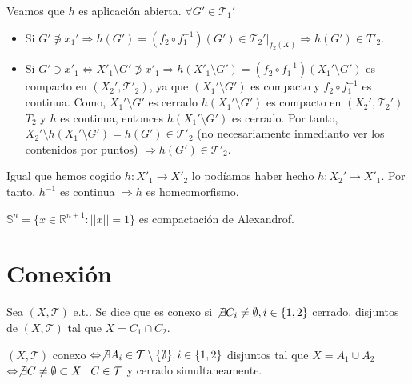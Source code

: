 \begin{dem}
\begin{enumerate}[label=(\roman*)]
      Veamos que $h$ es aplicación abierta. $\forall G' \in \mathcal{T}_{1}'$
      \begin{itemize}
        \item Si $G' \not \ni x_{1}' \Rightarrow h(G') = (f_{2} \circ f_{1}^{-1})(G') \in \mathcal{T}_{2}'|_{f_{2}(X)} \Rightarrow h(G') \in T'_{2}$.
        \item Si $G' \ni x'_{1} \Leftrightarrow X'_{1} \setminus G' \not \ni x'_{1} \Rightarrow h(X'_{1} \setminus G') = (f_{2} \circ f_{1}^{-1}) (X_{1}' \setminus G')$ es compacto en $(X_{2}', \mathcal{T}'_{2})$, ya que $(X_{1}' \setminus G')$ es compacto y $f_{2} \circ f_{1}^{-1}$ es continua. Como, $X_{1}' \setminus G'$ es cerrado $h(X_{1}' \setminus G')$ es compacto en $( X_{2}', \mathcal{T}_{2}' )$ $T_{2}$ y $h$ es continua, entonces $h(X_{1}' \setminus G')$ es cerrado. Por tanto, $X_{2}' \setminus h(X_{1}' \setminus G') = h(G') \in \mathcal{T}'_{2}$ (no necesariamente inmedianto ver los contenidos por puntos) $\Rightarrow h(G') \in \mathcal{T}'_{2}$.
      \end{itemize}
      Igual que hemos cogido $h : X'_{1} \to X'_{2}$ lo podíamos haber hecho $h : X_{2}' \to X'_{1}$. Por tanto, $h^{-1}$ es continua $\Rightarrow h$ es homeomorfismo.
  \end{enumerate}
\end{dem}

\begin{ejm}
  $\mathbb{S}^{n} = \{ x \in \mathbb{R}^{n+1} : ||x|| = 1 \}$ es compactación de Alexandrof.
\end{ejm}

\chapter{Conexión}

\begin{defn}[Conexo]
  Sea $( X, \mathcal{T} )$ e.t.. Se dice que es conexo si $\not \exists C_{i} \neq \emptyset, i \in \{ 1, 2 \}$ cerrado, disjuntos de $( X, \mathcal{T} )$ tal que $X = C_{1} \cap C_{2}$.
\end{defn}

\begin{obs}
  $( X, \mathcal{T} )$ conexo $\Leftrightarrow \not \exists A_{i} \in \mathcal{T} \setminus \{ \emptyset \}, i \in \{ 1, 2 \} $ disjuntos tal que $X = A_{1} \cup A_{2}$ $\Leftrightarrow \not \exists C \neq \emptyset \subset X : C \in \mathcal{T}$ y cerrado simultaneamente.
\end{obs} 

